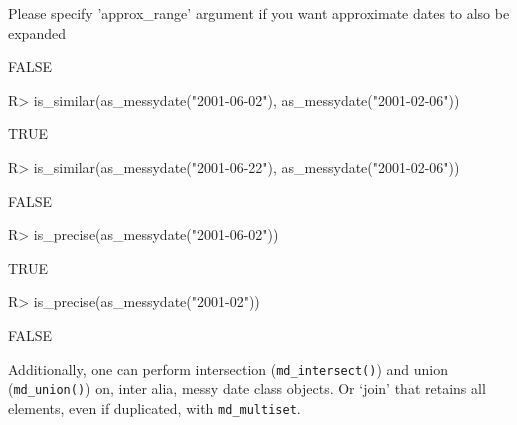 \documentclass[
]{jss}
\begin{document}
\begin{CodeChunk}
\begin{CodeOutput}
Please specify 'approx_range' argument if you want approximate dates to also be expanded
\end{CodeOutput}
\begin{CodeOutput}
[1] FALSE
\end{CodeOutput}
\begin{CodeInput}
R> is_similar(as_messydate("2001-06-02"), as_messydate("2001-02-06"))
\end{CodeInput}
\begin{CodeOutput}
[1] TRUE
\end{CodeOutput}
\begin{CodeInput}
R> is_similar(as_messydate("2001-06-22"), as_messydate("2001-02-06"))
\end{CodeInput}
\begin{CodeOutput}
[1] FALSE
\end{CodeOutput}
\begin{CodeInput}
R> is_precise(as_messydate("2001-06-02"))
\end{CodeInput}
\begin{CodeOutput}
[1] TRUE
\end{CodeOutput}
\begin{CodeInput}
R> is_precise(as_messydate("2001-02"))
\end{CodeInput}
\begin{CodeOutput}
[1] FALSE
\end{CodeOutput}
\end{CodeChunk}

Additionally, one can perform intersection (\texttt{md\_intersect()})
and union (\texttt{md\_union()}) on, inter alia, messy date class
objects. Or `join' that retains all elements, even if duplicated, with
\texttt{md\_multiset}.
\end{document}
